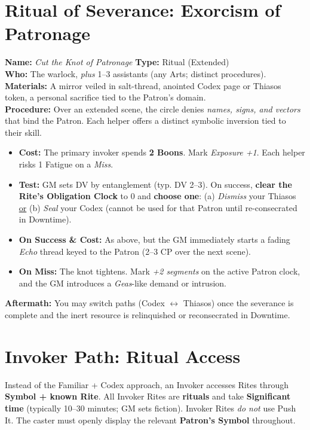 \documentclass[12pt,twoside]{book}
\begin{document}
\section{Ritual of Severance: Exorcism of Patronage}
\label{subsec:exorcism}
\textbf{Name:} \emph{Cut the Knot of Patronage} \quad \textbf{Type:} Ritual (Extended) \\
\textbf{Who:} The warlock, \emph{plus} 1--3 assistants (any Arts; distinct procedures). \\
\textbf{Materials:} A mirror veiled in salt-thread, anointed Codex page or Thiasos token, a personal sacrifice tied to the Patron's domain. \\
\textbf{Procedure:} Over an extended scene, the circle denies \emph{names, signs, and vectors} that bind the Patron. Each helper offers a distinct symbolic inversion tied to their skill.
\begin{itemize}
  \item \textbf{Cost:} The primary invoker spends \textbf{2 Boons}. Mark \emph{Exposure +1}. Each helper risks 1 Fatigue on a \emph{Miss}.
  \item \textbf{Test:} GM sets DV by entanglement (typ. DV 2–3). On success, \textbf{clear the Rite's Obligation Clock} to 0 and \textbf{choose one}: (a) \emph{Dismiss} your Thiasos \underline{or} (b) \emph{Seal} your Codex (cannot be used for that Patron until re-consecrated in Downtime).
  \item \textbf{On Success \& Cost:} As above, but the GM immediately starts a fading \emph{Echo} thread keyed to the Patron (2–3 CP over the next scene).
  \item \textbf{On Miss:} The knot tightens. Mark \emph{+2 segments} on the active Patron clock, and the GM introduces a \emph{Geas}-like demand or intrusion.
\end{itemize}
\textbf{Aftermath:} You may switch paths (Codex $\leftrightarrow$ Thiasos) once the severance is complete and the inert resource is relinquished or reconsecrated in Downtime.


\section*{Invoker Path: Ritual Access}

Instead of the Familiar + Codex approach, an Invoker accesses Rites through \textbf{Symbol + known Rite}. All Invoker Rites are \textbf{rituals} and take \textbf{Significant time} (typically 10–30 minutes; GM sets fiction). Invoker Rites \emph{do not} use Push It. The caster must openly display the relevant \textbf{Patron's Symbol} throughout.
\end{document}
